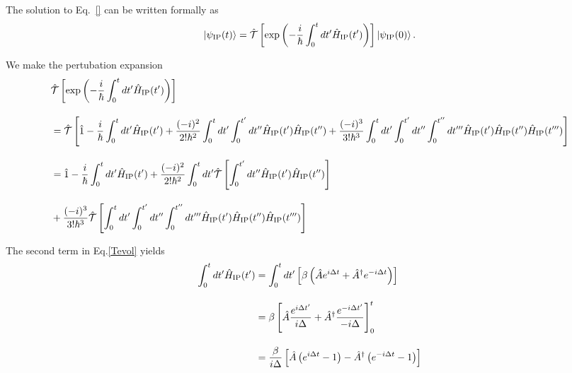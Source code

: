 The solution to Eq.~\eqref{} can be written formally as
\begin{equation}
    \ket{\psi_{\rm{IP}}(t)}=
    \hat{\mathcal{T}}\left[
    \exp{\left(
    -\frac{i}{\hbar}\int_0^t dt^\prime \hat{H}_{\rm{IP}}(t^\prime)
    \right)}
    \right]\ket{\psi_{\rm{IP}}(0)}.
\end{equation}

We make the pertubation expansion
\begin{align}\label{Tevol}
    &\hat{\mathcal{T}}\left[
    \exp{\left(
    -\frac{i}{\hbar}\int_0^t dt^\prime \hat{H}_{\rm{IP}}(t^\prime)
    \right)}
    \right]\nn[10pt]
    &=\hat{\mathcal{T}}\left[
    \hat{1}-\frac{i}{\hbar}\int_0^{t}dt^\prime \hat{H}_{\rm{IP}}(t^\prime)
    +\frac{(-i)^2}{2!\hbar^2}\int_0^{t}dt^\prime 
    \int_0^{t^\prime}dt^{\prime\prime} \hat{H}_{\rm{IP}}(t^\prime)\hat{H}_{\rm{IP}}(t^{\prime\prime})
    +\frac{(-i)^3}{3!\hbar^3}
    \int_0^{t}dt^\prime
    \int_0^{t^\prime}dt^{\prime\prime}
    \int_0^{t^{\prime\prime}}dt^{\prime\prime\prime}
    \hat{H}_{\rm{IP}}(t^\prime)\hat{H}_{\rm{IP}}(t^{\prime\prime})
    \hat{H}_{\rm{IP}}(t^{\prime\prime\prime})
    \right]\nn[10pt]
    &=
    \hat{1}-\frac{i}{\hbar}\int_0^{t}dt^\prime \hat{H}_{\rm{IP}}(t^\prime)
    +\frac{(-i)^2}{2!\hbar^2}\int_0^{t}dt^\prime
    \hat{\mathcal{T}}\left[
    \int_0^{t^\prime}dt^{\prime\prime} \hat{H}_{\rm{IP}}(t^\prime)\hat{H}_{\rm{IP}}(t^{\prime\prime})\right]\nn[10pt]
    &+\frac{(-i)^3}{3!\hbar^3}
    \hat{\mathcal{T}}\left[
    \int_0^{t}dt^\prime
    \int_0^{t^\prime}dt^{\prime\prime}
    \int_0^{t^{\prime\prime}}dt^{\prime\prime\prime}
    \hat{H}_{\rm{IP}}(t^\prime)\hat{H}_{\rm{IP}}(t^{\prime\prime})
    \hat{H}_{\rm{IP}}(t^{\prime\prime\prime})
    \right]
\end{align}

The second term in Eq.\eqref{Tevol} yields
\begin{align}
    \int_0^{t}dt^\prime \hat{H}_{\rm{IP}}(t^\prime)
    &=\int_0^{t}dt^\prime 
    \left[
    \beta
    \left(
    \hat{A}e^{i\Delta t} 
    + \hat{A}^{\dagger}e^{-i\Delta t} 
    \right)
    \right]\nn[10pt]
    &=\beta
    \left[
    \hat{A}
    \frac{e^{i\Delta t^\prime}}{i\Delta}
    +\hat{A}^\dagger\frac{e^{-i\Delta t^\prime}}{-i\Delta}
    \right]_0^t\nn[10pt]
    &=\frac{\beta}{i\Delta}
    \left[
    \hat{A}
    \left(e^{i\Delta t}-1\right)
    -\hat{A}^\dagger\left(e^{-i\Delta t}-1\right)
    \right]
\end{align}


